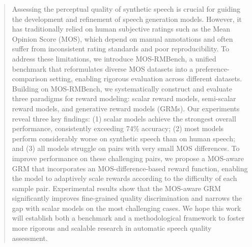 \begin{abstract}
Assessing the perceptual quality of synthetic speech is crucial for guiding the development and refinement of speech generation models. However, it has traditionally relied on human subjective ratings such as the Mean Opinion Score (MOS), which depend on manual annotations and often suffer from inconsistent rating standards and poor reproducibility. To address these limitations, we introduce MOS-RMBench, a unified benchmark that reformulates diverse MOS datasets into a preference-comparison setting, enabling rigorous evaluation across different datasets. Building on MOS-RMBench, we systematically construct and evaluate three paradigms for reward modeling: scalar reward models, semi-scalar reward models, and generative reward models (GRMs). Our experiments reveal three key findings: (1) scalar models achieve the strongest overall performance, consistently exceeding 74\% accuracy; (2) most models perform considerably worse on synthetic speech than on human speech; and (3) all models struggle on pairs with very small MOS differences. To improve performance on these challenging pairs, we propose a MOS-aware GRM that incorporates an MOS-difference-based reward function, enabling the model to adaptively scale rewards according to the difficulty of each sample pair. Experimental results show that the MOS-aware GRM significantly improves fine-grained quality discrimination and narrows the gap with scalar models on the most challenging cases. We hope this work will establish both a benchmark and a methodological framework to foster more rigorous and scalable research in automatic speech quality assessment.
\end{abstract}